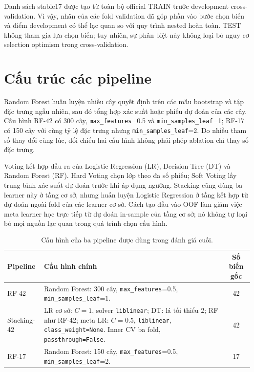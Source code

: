 Danh sách stable17 được tạo từ toàn bộ official TRAIN trước development cross-validation. Vì vậy, nhãn của các fold validation đã góp phần vào bước chọn biến và điểm development có thể lạc quan so với quy trình nested hoàn toàn. TEST không tham gia lựa chọn biến; tuy nhiên, sự phân biệt này không loại bỏ nguy cơ selection optimism trong cross-validation.

\section{Cấu trúc các pipeline}
\label{sec:method-pipelines}

Random Forest huấn luyện nhiều cây quyết định trên các mẫu bootstrap và tập đặc trưng ngẫu nhiên, sau đó tổng hợp xác suất hoặc phiếu dự đoán của các cây. Cấu hình RF-42 có 300 cây, \texttt{max\_features}=0.5 và \texttt{min\_samples\_leaf}=1; RF-17 có 150 cây với cùng tỷ lệ đặc trưng nhưng \texttt{min\_samples\_leaf}=2. Do nhiều tham số thay đổi cùng lúc, đối chiếu hai cấu hình không phải phép ablation chỉ thay số đặc trưng.

Voting kết hợp đầu ra của Logistic Regression (LR), Decision Tree (DT) và Random Forest (RF). Hard Voting chọn lớp theo đa số phiếu; Soft Voting lấy trung bình xác suất dự đoán trước khi áp dụng ngưỡng. Stacking cũng dùng ba learner này ở tầng cơ sở, nhưng huấn luyện Logistic Regression ở tầng kết hợp từ dự đoán ngoài fold của các learner cơ sở. Cách tạo đầu vào OOF làm giảm việc meta learner học trực tiếp từ dự đoán in-sample của tầng cơ sở; nó không tự loại bỏ mọi nguồn lạc quan trong quá trình chọn cấu hình.

\begin{table}[htbp]
\centering
\small
\renewcommand{\arraystretch}{1.3}
\setlength{\tabcolsep}{6pt}
\caption{Cấu hình của ba pipeline được dùng trong đánh giá cuối.}
\label{tab:frozen-candidates}
\begin{tabularx}{\linewidth}{>{\raggedright\arraybackslash}p{2.5cm}X S[table-format=2.0]}
\toprule
Pipeline & Cấu hình chính & {Số biến gốc}\\
\midrule
RF-42 & Random Forest: 300 cây, \texttt{max\_features}=0.5, \texttt{min\_samples\_leaf}=1. & 42\\
Stacking-42 & LR cơ sở: $C=1$, solver \texttt{liblinear}; DT: lá tối thiểu 2; RF như RF-42; meta LR: $C=0.5$, \texttt{liblinear}, \texttt{class\_weight=None}. Inner CV ba fold, \texttt{passthrough=False}. & 42\\
RF-17 & Random Forest: 150 cây, \texttt{max\_features}=0.5, \texttt{min\_samples\_leaf}=2. & 17\\
\bottomrule
\end{tabularx}
\end{table}

